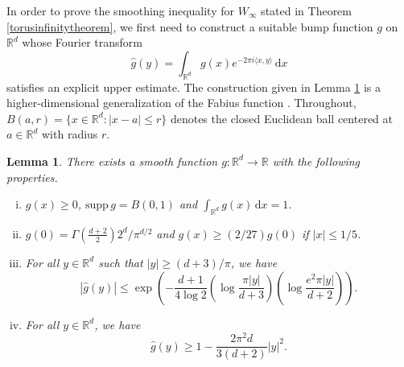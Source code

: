 \documentclass[11pt,a4paper]{article}
\newtheorem{lem}[thm]{Lemma}
\theoremstyle{definition}
\begin{document}
In order to prove the smoothing inequality for $W_{\infty}$ stated in Theorem \ref{torusinfinitytheorem}, we first need to construct a suitable bump function $g$ on $\mathbb{R}^d$ whose Fourier transform
\[ \widehat{g}(y) = \int_{\mathbb{R}^d} g(x) e^{-2 \pi i \langle x,y \rangle} \, \mathrm{d}x \]
satisfies an explicit upper estimate. The construction given in Lemma \ref{bumpfunctionlemma} is a higher-dimensional generalization of the Fabius function \cite{FA}. Throughout, $B(a,r)=\{ x \in \mathbb{R}^d : |x-a| \le r \}$ denotes the closed Euclidean ball centered at $a \in \mathbb{R}^d$ with radius $r$. 
\begin{lem}\label{bumpfunctionlemma} There exists a smooth function $g: \mathbb{R}^d \to \mathbb{R}$ with the following properties.
\begin{enumerate}[(i)]
\item $g(x) \ge 0$, $\mathrm{supp} \, g = B(0,1)$ and $\int_{\mathbb{R}^d} g(x) \, \mathrm{d}x=1$.

\item $g(0)=\Gamma \left( \frac{d+2}{2} \right) 2^d /\pi^{d/2}$ and $g(x) \ge (2/27) g(0)$ if $|x|\le 1/5$.

\item For all $y \in \mathbb{R}^d$ such that $|y| \ge (d+3)/\pi$, we have
\[ |\widehat{g}(y)| \le \exp \left( - \frac{d+1}{4 \log 2} \left( \log \frac{\pi |y|}{d+3} \right) \left( \log \frac{e^2 \pi |y|}{d+2} \right) \right) . \]

\item For all $y \in \mathbb{R}^d$, we have
\[ \widehat{g}(y) \ge 1- \frac{2 \pi^2 d}{3(d+2)} |y|^2 . \]
\end{enumerate}
\end{lem}
\end{document}
